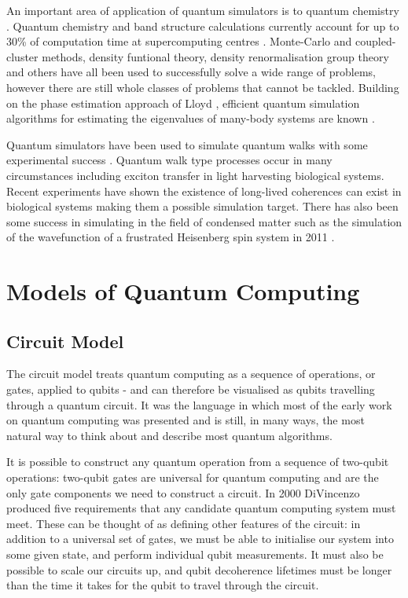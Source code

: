 An important area of application of quantum simulators is to quantum chemistry \cite{science_quantum_simulator_review_09}. Quantum chemistry and band structure calculations currently account for up to 30\% of computation time at supercomputing centres \cite{simulation_photon_review, supercomputer_report_10}. Monte-Carlo and coupled-cluster methods, density funtional theory, density renormalisation group theory and others have all been used to successfully solve a wide range of problems, however there are still whole classes of problems that cannot be tackled. Building on the phase estimation approach of Lloyd \cite{lloyd_simulate_eigenvalues_99, lloyd_simulate_many_body_97}, efficient quantum simulation algorithms for estimating the eigenvalues of many-body systems are known \cite{quantum_chem_alg_05, simulation_hamiltonians_11}.

Quantum simulators have been used to simulate quantum walks \cite{farhi_quantum_walks_98} with some experimental success \cite{quantum_walks_simulated_08}. Quantum walk type processes occur in many circumstances including exciton transfer in light harvesting biological systems. Recent experiments have shown the existence of long-lived coherences can exist in biological systems \cite{quant_bio_coherences_1, quant_bio_coherences_2, quant_bio_coherences_3} making them a possible simulation target. There has also been some success in simulating in the field of condensed matter such as the simulation of the wavefunction of a frustrated Heisenberg spin system in 2011 \cite{simulation_frustrated_spins_11}.

\section{Models of Quantum Computing}

\subsection{Circuit Model}

The circuit model treats quantum computing as a sequence of operations, or gates, applied to qubits - and can therefore be visualised as qubits travelling through a quantum circuit. It was the language in which most of the early work on quantum computing was presented and is still, in many ways, the most natural way to think about and describe most quantum algorithms.

It is possible to construct any quantum operation from a sequence of two-qubit operations: two-qubit gates are universal for quantum computing \cite{two_bit_gates_universal} and are the only gate components we need to construct a circuit. In 2000 DiVincenzo produced five requirements \cite{divincenzo_requirements} that any candidate quantum computing system must meet. These can be thought of as defining other features of the circuit: in addition to a universal set of gates, we must be able to initialise our system into some given state, and perform individual qubit measurements. It must also be possible to scale our circuits up, and qubit decoherence lifetimes must be longer than the time it takes for the qubit to travel through the circuit.


